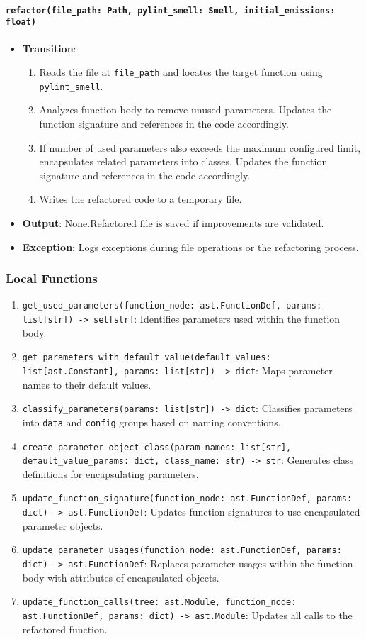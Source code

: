 \documentclass[12pt, titlepage]{article}
\begin{document}
\paragraph{\texttt{refactor(file\_path: Path, pylint\_smell: Smell, initial\_emissions: float)}}
\begin{itemize}
\item \textbf{Transition}:
\begin{enumerate}
\item Reads the file at \texttt{file\_path} and locates the target function using \texttt{pylint\_smell}.
\item Analyzes function body to remove unused parameters. Updates the function signature and references in the code accordingly.
\item If number of used parameters also exceeds the maximum configured limit, encapsulates related parameters into classes. Updates the function signature and references in the code accordingly.
\item Writes the refactored code to a temporary file.
\end{enumerate}
\item \textbf{Output}: None.Refactored file is saved if improvements are validated. 
\item \textbf{Exception}: Logs exceptions during file operations or the refactoring process.
\end{itemize}

\subsubsection{Local Functions}

\begin{enumerate}
\item \texttt{get\_used\_parameters(function\_node: ast.FunctionDef, params: list[str]) -> set[str]}: Identifies parameters used within the function body.
\item \texttt{get\_parameters\_with\_default\_value(default\_values: list[ast.Constant], params: list[str]) -> dict}: Maps parameter names to their default values.
\item \texttt{classify\_parameters(params: list[str]) -> dict}: Classifies parameters into \texttt{data} and \texttt{config} groups based on naming conventions.
\item \texttt{create\_parameter\_object\_class(param\_names: list[str], default\_value\_params: dict, class\_name: str) -> str}: Generates class definitions for encapsulating parameters.
\item \texttt{update\_function\_signature(function\_node: ast.FunctionDef, params: dict) -> ast.FunctionDef}: Updates function signatures to use encapsulated parameter objects.
\item \texttt{update\_parameter\_usages(function\_node: ast.FunctionDef, params: dict) -> ast.FunctionDef}: Replaces parameter usages within the function body with attributes of encapsulated objects.
\item \texttt{update\_function\_calls(tree: ast.Module, function\_node: ast.FunctionDef, params: dict) -> ast.Module}: Updates all calls to the refactored function.
\end{enumerate}
\end{document}
